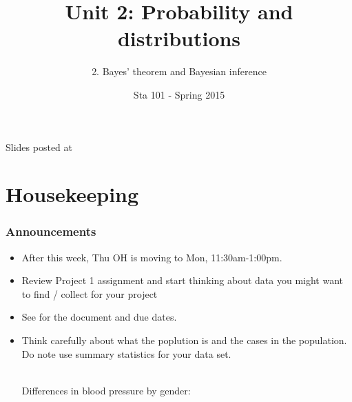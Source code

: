 \documentclass[slidestop,compress,mathserif,12pt,t,professionalfonts,xcolor=table]{beamer}
\title{Unit 2: Probability and distributions}
\subtitle{2. Bayes' theorem and Bayesian inference}
\author{Sta 101 - Spring 2015}
\institute{Duke University, Department of Statistical Science}
\begin{document}



\begin{frame}[plain]

\titlepage
\vfill
{\scriptsize {} \hfill Slides posted at  \webLink{\CourseSite}{\CourseSite}}
\addtocounter{framenumber}{-1} 

\end{frame}


\section{Housekeeping}


\begin{frame}
\frametitle{Announcements}

\begin{itemize}

\item After this week, Thu OH is moving to Mon, 11:30am-1:00pm.

\item Review Project 1 assignment and start thinking about data you might want to find / collect for your project

\item See \webLink{\CourseSite}{\CourseSite} for the document and due dates.

\item Think carefully about what the poplution is and the cases in the population.  Do note use summary statistics for your data set.

\hfill \\

Differences in blood pressure by gender: 

\end{itemize}


\end{frame}
\end{document}
